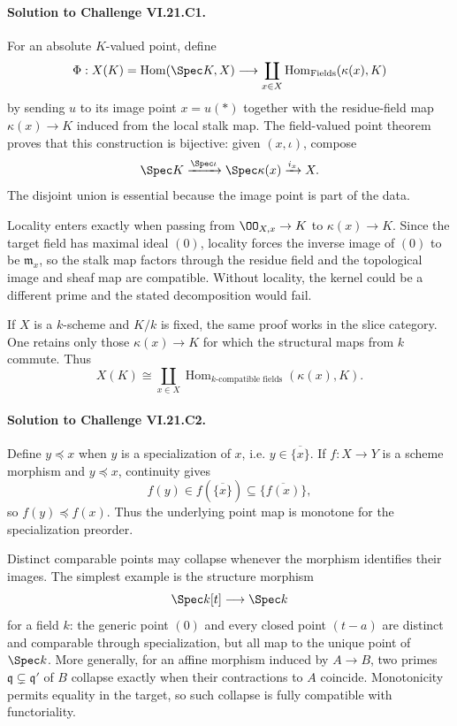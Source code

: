 \paragraph{Solution to Challenge VI.21.C1.}
\begin{solution}
For an absolute $K$-valued point, define
\[
\Phi:X(K)=\operatorname{Hom}(\Spec K,X)
\longrightarrow
\coprod_{x\in X}\operatorname{Hom}_{\mathrm{Fields}}(\kappa(x),K)
\]
by sending $u$ to its image point $x=u(*)$ together with the residue-field map
$\kappa(x)\to K$ induced from the local stalk map.  The field-valued point theorem proves that
this construction is bijective: given $(x,\iota)$, compose
\[
\Spec K\xrightarrow{\Spec\iota}\Spec\kappa(x)
\xrightarrow{i_x}X.
\]
The disjoint union is essential because the image point is part of the data.

Locality enters exactly when passing from $\OO_{X,x}\to K$ to $\kappa(x)\to K$.  Since the target
field has maximal ideal $(0)$, locality forces the inverse image of $(0)$ to be
$\mathfrak m_x$, so the stalk map factors through the residue field and the topological image and
sheaf map are compatible.  Without locality, the kernel could be a different prime and the stated
decomposition would fail.

If $X$ is a $k$-scheme and $K/k$ is fixed, the same proof works in the slice category.  One retains
only those $\kappa(x)\to K$ for which the structural maps from $k$ commute.  Thus
\[
X(K)\cong\coprod_{x\in X}
\operatorname{Hom}_{k\text{-compatible fields}}(\kappa(x),K).
\]
\end{solution}

\paragraph{Solution to Challenge VI.21.C2.}
\begin{solution}
Define $y\preceq x$ when $y$ is a specialization of $x$, i.e.
$y\in\overline{\{x\}}$.  If $f:X\to Y$ is a scheme morphism and $y\preceq x$, continuity gives
\[
f(y)\in f(\overline{\{x\}})
\subseteq\overline{\{f(x)\}},
\]
so $f(y)\preceq f(x)$.  Thus the underlying point map is monotone for the specialization preorder.

Distinct comparable points may collapse whenever the morphism identifies their images.  The
simplest example is the structure morphism
\[
\Spec k[t]\longrightarrow\Spec k
\]
for a field $k$: the generic point $(0)$ and every closed point $(t-a)$ are distinct and comparable
through specialization, but all map to the unique point of $\Spec k$.  More generally, for an
affine morphism induced by $A\to B$, two primes $\mathfrak q\subsetneq\mathfrak q'$ of $B$ collapse
exactly when their contractions to $A$ coincide.  Monotonicity permits equality in the target, so
such collapse is fully compatible with functoriality.
\end{solution}


